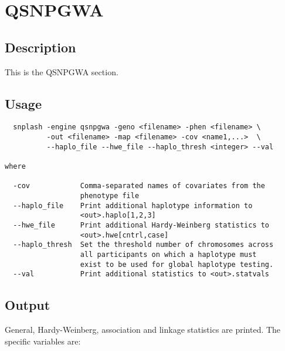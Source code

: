 \section{QSNPGWA}
\label{sec:qsnpgwa}
\subsection{Description}
This is the QSNPGWA section.
\subsection{Usage}
\begin{verbatim}
  snplash -engine qsnpgwa -geno <filename> -phen <filename> \
          -out <filename> -map <filename> -cov <name1,...>  \
          --haplo_file --hwe_file --haplo_thresh <integer> --val

where

  -cov            Comma-separated names of covariates from the
                  phenotype file
  --haplo_file    Print additional haplotype information to
                  <out>.haplo[1,2,3]
  --hwe_file      Print additional Hardy-Weinberg statistics to
                  <out>.hwe[cntrl,case]
  --haplo_thresh  Set the threshold number of chromosomes across
                  all participants on which a haplotype must 
                  exist to be used for global haplotype testing.
  --val           Print additional statistics to <out>.statvals

\end{verbatim}

\subsection{Output}
General, Hardy-Weinberg, association and linkage statistics are printed.  The
specific  variables are:

